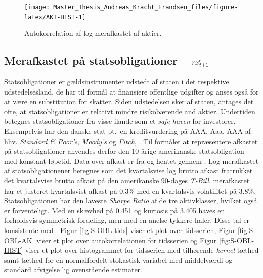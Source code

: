 \documentclass[
  a4paper,
  oneside]{memoir}
\begin{document}
\begin{figure}[htbp!]

{\centering \texttt{[image: Master\_Thesis\_Andreas\_Kracht\_Frandsen\_files/figure-latex/AKT-HIST-1]} 

}

\caption{Autokorrelation af log merafkastet af aktier.}\label{fig:AKT-HIST}
\end{figure}

\hypertarget{merafkastet-puxe5-statsobligationer-rx_t1textnormals}{%
\subsection{\texorpdfstring{Merafkastet på statsobligationer -- \(rx_{t+1}^{\textnormal{s}}\)}{Merafkastet på statsobligationer -- rx\_\{t+1\}\^{}\{\textbackslash textnormal\{s\}\}}}\label{merafkastet-puxe5-statsobligationer-rx_t1textnormals}}

Statsobligationer er gældsinstrumenter udstedt af staten i det respektive udstedelsesland, de har til formål at finansiere offentlige udgifter og anses også for at være en substitution for skatter. Siden udstedelsen sker af staten, antages det ofte, at statsobligationer er relativt mindre risikobærende and aktier. Undertiden betegnes statsobligationer fra visse ilande som et \emph{safe haven} for investorer. Eksempelvis har den danske stat pt.~en kreditvurdering på AAA, Aaa, AAA af hhv. \emph{Standard \& Poor's}, \emph{Moody's} og \emph{Fitch}, \citep{TradingEconomics2020}. Til formålet at repræsentere afkastet på statsobligationer anvendes derfor den 10-årige amerikanske statsobligation med konstant løbetid. Data over afkast er fra \citep{CRSPt90} og hentet gennem \citep{WRDSt90}. Log merafkastet af statsobligationener beregnes som det kvartalsvise log brutto afkast fratrukket det kvartalsvise brutto afkast på den amerikanske 90-dages \emph{T-Bill}. merafkastet har et justeret kvartalsvist afkast på 0.3\(\%\) med en kvartalsvis volatilitet på 3.8\(\%\). Statsobligationen har den laveste \emph{Sharpe Ratio} af de tre aktivklasser, hvilket også er forventeligt. Med en skævhed på 0.451 og kurtosis på 3.405 haves en forholdsvis symmetrisk fordeling, men med en anelse tykkere haler. Disse tal er konsistente med \citep{CampVic2003}. Figur \ref{fig:S-OBL-tids} viser et plot over tidsserien, Figur \ref{fig:S-OBL-AK} viser et plot over autokorrelationen for tidsserien og Figur \ref{fig:S-OBL-HIST} viser et plot over histogrammet for tidsserien med tilhørende \emph{kernel} tæthed samt tæthed for en normalfordelt stokastisk variabel med middelværdi og standard afvigelse lig ovenstående estimater.
\end{document}
